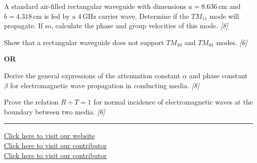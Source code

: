 \documentclass[11pt,a4paper]{article}
\newcommand{\pts}[1]{\hfill   \textit{[#1]}}
\begin{document}
\begin{parts}
  \item A standard air-filled rectangular waveguide with dimensions $a = 8.636\, \text{cm}$ and $b = 4.318\, \text{cm}$ is fed by a $4\, \text{GHz}$ carrier wave. Determine if the $TM_{11}$ mode will propagate. If so, calculate the phase and group velocities of this mode. \pts{8}
  \item Show that a rectangular waveguide does not support $TM_{10}$ and $TM_{01}$ modes. \pts{6}
\end{parts}
\hfill   \textbf{OR}

\begin{parts}
  \item Derive the general expressions of the attenuation constant $\alpha$ and phase constant $\beta$ for electromagnetic wave propagation in conducting media. \pts{8}
  \item Prove the relation $R + T = 1$ for normal incidence of electromagnetic waves at the boundary between two media. \pts{6}
\end{parts}

\vfill
\rule{\linewidth}{0.4pt}

\begin{center}\small
  \href{https://bhu-exam.vercel.app/}{Click here to visit our website}\\[4pt]
  \href{https://me-aryan.vercel.app/}{Click here to visit our contributor}\\[4pt]
  \href{https://quashan-me.vercel.app/}{Click here to visit our contributor}
\end{center}
\end{document}

